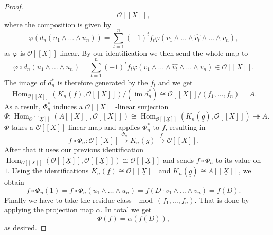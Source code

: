 \documentclass{article}
\theoremstyle{plain}%
\theoremstyle{definition}
\theoremstyle{remark}
\newcommand{\im}{\operatorname{im}}
\renewcommand{\hom}{\operatorname{Hom}}
\begin{document}
\begin{proof}
\[        \mathcal{O}[[\underline{X}]],  
    \]
    where the composition is given by 
    \[
        \varphi(d_n(u_1 \wedge \dots \wedge u_n)) = \sum_{t=1}^n (-1)^t f_t 
        \varphi(v_1 \wedge \dots \wedge \widehat{v_t} \wedge \dots \wedge v_n), 
    \]
    as \(\varphi\) is \(\mathcal{O}[[\underline{X}]]\)-linear.
    By our identification we then send the whole map to 
    \[
        \varphi \circ d_n(u_1\wedge\dots\wedge u_n) = \sum_{t=1}^n (-1)^t f_t 
        \varphi(v_1 \wedge \dots \wedge \widehat{v_t} \wedge \dots \wedge v_n) \in \mathcal{O}[[\underline{X}]].
    \]
    The image of \(d_n^*\) is therefore generated by the \(f_t\) and we get 
    \[
        \hom_{\mathcal{O}[[\underline{X}]]}(K_n(\underline{f}), \mathcal{O}[[\underline{X}]])/(\im d_n^*) 
        \cong \mathcal{O}[[\underline{X}]]/(f_1, \dots, f_n) = A.
    \]
    As a result, \(\Phi_n^*\) induces a \(\mathcal{O}[[\underline{X}]]\)-linear surjection
    \[
        \Phi\colon \hom_{\mathcal{O}[[\underline{X}]]}(A[[\underline{X}]], \mathcal{O}[[\underline{X}]]) \cong 
        \hom_{\mathcal{O}[[\underline{X}]]}(K_n(\underline{g}), \mathcal{O}[[\underline{X}]]) \twoheadrightarrow A.
    \]
    \(\Phi\) takes a \(\mathcal{O}[[\underline{X}]]\)-linear map and applies \(\Phi_n^*\) to \(f\), resulting in 
    \[
        f \circ \Phi_n\colon \mathcal{O}[[\underline{X}]] \xrightarrow{\Phi_n} K_n(g) 
        \xrightarrow{f} \mathcal{O}[[\underline{X}]].
    \]
    After that it uses our previous identification 
    \(\hom_{\mathcal{O}[[\underline{X}]]}(\mathcal{O}[[\underline{X}]], \mathcal{O}[[\underline{X}]])
    \cong \mathcal{O}[[\underline{X}]]\) 
    and sends \(f \circ \Phi_n\) to its value on \(1\). Using the identifications 
    \(K_n(\underline{f})\cong \mathcal{O}[[\underline{X}]]\) and \(K_n(\underline{g})\cong A[[\underline{X}]]\), we obtain
    \[
        f \circ \Phi_n(1) = f \circ \Phi_n(u_1\wedge\dots\wedge u_n) = f(D\cdot v_1\wedge\dots\wedge v_n) = f(D).
    \]
    Finally we have to take the residue class \(\!\!\!\mod (f_1, \dots, f_n)\). 
    That is done by applying the projection map \(\alpha\). In total we get
    \[
        \Phi(f) = \alpha(f(D)),  
    \]
    as desired.
\end{proof}
\end{document}
